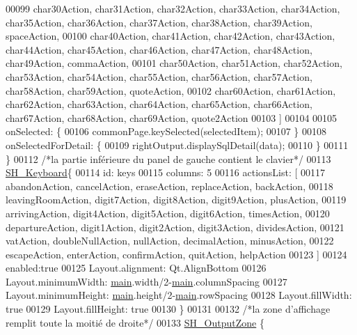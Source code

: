 \begin{DoxyCode}
00099                 char30Action, char31Action, char32Action, char33Action, char34Action, char35Action, 
      char36Action, char37Action, char38Action, char39Action, spaceAction,
00100                 char40Action, char41Action, char42Action, char43Action, char44Action, char45Action, 
      char46Action, char47Action, char48Action, char49Action, commaAction,
00101                 char50Action, char51Action, char52Action, char53Action, char54Action, char55Action, 
      char56Action, char57Action, char58Action, char59Action, quoteAction,
00102                 char60Action, char61Action, char62Action, char63Action, char64Action, char65Action, 
      char66Action, char67Action, char68Action, char69Action, quote2Action
00103             ]
00104 
00105             onSelected: \{
00106                commonPage.keySelected(selectedItem);
00107             \}
00108             onSelectedForDetail: \{
00109                 rightOutput.displaySqlDetail(data);
00110             \}
00111         \}
00112         \textcolor{comment}{/*la partie inférieure du panel de gauche contient le clavier*/}
00113         \hyperlink{classSH__Keyboard}{SH\_Keyboard}\{
00114             \textcolor{keywordtype}{id}: keys
00115             columns: 5
00116             actionsList: [
00117                 abandonAction, cancelAction, eraseAction, replaceAction, backAction,
00118                 leavingRoomAction, digit7Action, digit8Action, digit9Action, plusAction,
00119                 arrivingAction, digit4Action, digit5Action, digit6Action, timesAction,
00120                 departureAction, digit1Action, digit2Action, digit3Action, dividesAction,
00121                 vatAction, doubleNullAction, nullAction, decimalAction, minusAction,
00122                 escapeAction, enterAction, confirmAction, quitAction, helpAction
00123             ]
00124             enabled:\textcolor{keyword}{true}
00125             Layout.alignment: Qt.AlignBottom
00126             Layout.minimumWidth: \hyperlink{main_8cpp_a3c04138a5bfe5d72780bb7e82a18e627}{main}.width/2-\hyperlink{main_8cpp_a3c04138a5bfe5d72780bb7e82a18e627}{main}.columnSpacing
00127             Layout.minimumHeight: \hyperlink{main_8cpp_a3c04138a5bfe5d72780bb7e82a18e627}{main}.height/2-\hyperlink{main_8cpp_a3c04138a5bfe5d72780bb7e82a18e627}{main}.rowSpacing
00128             Layout.fillWidth: \textcolor{keyword}{true}
00129             Layout.fillHeight: \textcolor{keyword}{true}
00130         \}
00131 
00132         \textcolor{comment}{/*la zone d'affichage remplit toute la moitié de droite*/}
00133         \hyperlink{classSH__OutputZone}{SH\_OutputZone} \{

\end{DoxyCode}
